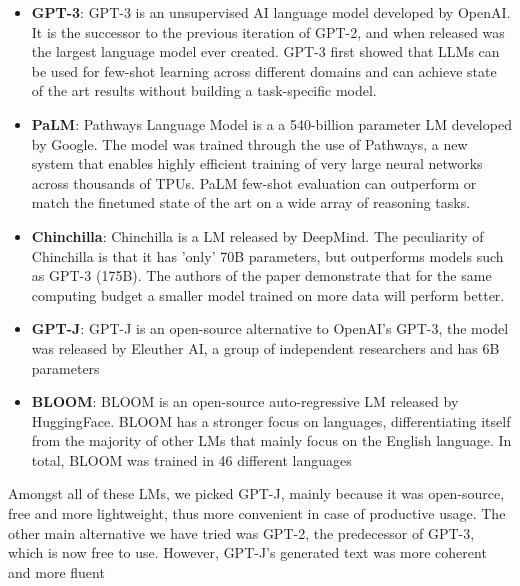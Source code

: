\begin{itemize}
    \item \textbf{GPT-3}: GPT-3\cite{brown2020language} is an unsupervised AI language model developed by OpenAI. It is the successor to the previous iteration of GPT-2, and when released was the largest language model ever created. GPT-3 first showed that LLMs can be used for few-shot learning across different domains and can achieve state of the art results without building a task-specific model.
    \item \textbf{PaLM}: Pathways Language Model\cite{chowdhery2022palm} is a a 540-billion parameter LM developed by Google. The model was trained through the use of Pathways, a new system that enables highly efficient training of very large neural networks across thousands of TPUs. PaLM few-shot evaluation can outperform or match the finetuned state of the art on a wide array of reasoning tasks.
    \item \textbf{Chinchilla}: Chinchilla\cite{hoffmann2022training} is a LM released by DeepMind. The peculiarity of Chinchilla is that it has 'only' 70B parameters, but outperforms models such as GPT-3 (175B). The authors of the paper demonstrate that for the same computing budget a smaller model trained on more data will perform better.
    \item \textbf{GPT-J}: GPT-J\cite{gptj} is an open-source alternative to OpenAI's GPT-3, the model was released by Eleuther AI, a group of independent researchers and has 6B parameters
    \item \textbf{BLOOM}: BLOOM\cite{scao2022bloom} is an open-source auto-regressive LM released by HuggingFace. BLOOM has a stronger focus on languages, differentiating itself from the majority of other LMs that mainly focus on the English language. In total, BLOOM was trained in 46 different languages
\end{itemize}
Amongst all of these LMs, we picked GPT-J, mainly because it was open-source, free and more lightweight, thus more convenient in case of productive usage. The other main alternative we have tried was GPT-2\cite{radford2019language}, the predecessor of GPT-3, which is now free to use. However, GPT-J's generated text was more coherent and more fluent \\



